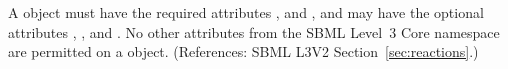A \Reaction object must have the required attributes ,
 and  , and may have the optional attributes
, ,  and .  No
other attributes from the SBML Level~3 Core namespace are permitted on a
\Reaction object.  (References: SBML L3V2 Section~\ref{sec:reactions}.)

